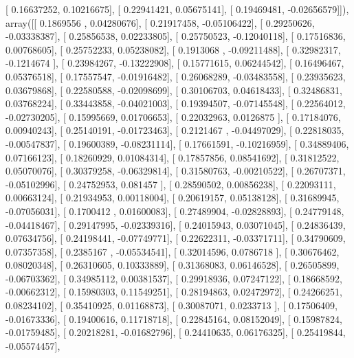 \documentclass{article}
\begin{document}
       [ 0.16637252,  0.10216675],
       [ 0.22941421,  0.05675141],
       [ 0.19469481, -0.02656579]]), array([[ 0.1869556 ,  0.04280676],
       [ 0.21917458, -0.05106422],
       [ 0.29250626, -0.03338387],
       [ 0.25856538,  0.02233805],
       [ 0.25750523, -0.12040118],
       [ 0.17516836,  0.00768605],
       [ 0.25752233,  0.05238082],
       [ 0.1913068 , -0.09211488],
       [ 0.32982317, -0.1214674 ],
       [ 0.23984267, -0.13222908],
       [ 0.15771615,  0.06244542],
       [ 0.16496467,  0.05376518],
       [ 0.17557547, -0.01916482],
       [ 0.26068289, -0.03483558],
       [ 0.23935623,  0.03679868],
       [ 0.22580588, -0.02098699],
       [ 0.30106703,  0.04618433],
       [ 0.32486831,  0.03768224],
       [ 0.33443858, -0.04021003],
       [ 0.19394507, -0.07145548],
       [ 0.22564012, -0.02730205],
       [ 0.15995669,  0.01706653],
       [ 0.22032963,  0.0126875 ],
       [ 0.17184076,  0.00940243],
       [ 0.25140191, -0.01723463],
       [ 0.2121467 , -0.04497029],
       [ 0.22818035, -0.00547837],
       [ 0.19600389, -0.08231114],
       [ 0.17661591, -0.10216959],
       [ 0.34889406,  0.07166123],
       [ 0.18260929,  0.01084314],
       [ 0.17857856,  0.08541692],
       [ 0.31812522,  0.05070076],
       [ 0.30379258, -0.06329814],
       [ 0.31580763, -0.00210522],
       [ 0.26707371, -0.05102996],
       [ 0.24752953,  0.081457  ],
       [ 0.28590502,  0.00856238],
       [ 0.22093111,  0.00663124],
       [ 0.21934953,  0.00118004],
       [ 0.20619157,  0.05138128],
       [ 0.31689945, -0.07056031],
       [ 0.1700412 ,  0.01600083],
       [ 0.27489904, -0.02828893],
       [ 0.24779148, -0.04418467],
       [ 0.29147995, -0.02339316],
       [ 0.24015943,  0.03071045],
       [ 0.24836439,  0.07634756],
       [ 0.24198441, -0.07749771],
       [ 0.22622311, -0.03371711],
       [ 0.34790609,  0.07357358],
       [ 0.2385167 , -0.05534541],
       [ 0.32014596,  0.0786718 ],
       [ 0.30676462,  0.08020348],
       [ 0.26310605,  0.10333889],
       [ 0.31368083,  0.06146528],
       [ 0.26505899, -0.06703362],
       [ 0.34985112,  0.00381537],
       [ 0.29918936,  0.07247122],
       [ 0.18668592, -0.00662312],
       [ 0.15980303,  0.11549251],
       [ 0.28194863,  0.02472972],
       [ 0.24266251,  0.08234102],
       [ 0.35410925,  0.01168873],
       [ 0.30087071,  0.0233713 ],
       [ 0.17506409, -0.01673336],
       [ 0.19400616,  0.11718718],
       [ 0.22845164,  0.08152049],
       [ 0.15987824, -0.01759485],
       [ 0.20218281, -0.01682796],
       [ 0.24410635,  0.06176325],
       [ 0.25419844, -0.05574457],
\end{document}

